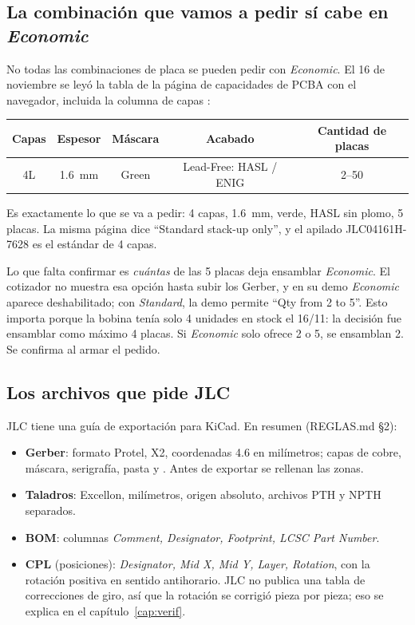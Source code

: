 \subsection{La combinación que vamos a pedir sí cabe en \emph{Economic}}

No todas las combinaciones de placa se pueden pedir con \emph{Economic}. El 16 de noviembre se leyó la tabla de la
página de capacidades de PCBA con el navegador, incluida la columna de capas
:

\begin{center}
\begin{tabular}{@{}ccccc@{}}
\toprule
\textbf{Capas} & \textbf{Espesor} & \textbf{Máscara} & \textbf{Acabado} & \textbf{Cantidad de placas}\\
\midrule
4L & \SI{1.6}{\milli\meter} & Green & Lead-Free: HASL / ENIG & 2--50\\
\bottomrule
\end{tabular}
\end{center}

Es exactamente lo que se va a pedir: 4 capas, \SI{1.6}{\milli\meter}, verde, HASL sin plomo, 5 placas. La misma
página dice ``Standard stack-up only'', y el apilado JLC04161H-7628 es el estándar de 4 capas.

\begin{ojo}
Lo que falta confirmar es \emph{cuántas} de las 5 placas deja ensamblar \emph{Economic}. El cotizador no muestra
esa opción hasta subir los Gerber, y en su demo \emph{Economic} aparece deshabilitado; con \emph{Standard}, la demo
permite ``Qty from 2 to 5''. Esto importa porque la bobina  tenía solo 4 unidades en stock el 16/11: la
decisión fue ensamblar como máximo 4 placas. Si \emph{Economic} solo ofrece 2 o 5, se ensamblan 2. Se confirma al
armar el pedido.
\end{ojo}

\subsection{Los archivos que pide JLC}
JLC tiene una guía de exportación para KiCad. En resumen (REGLAS.md §2):
\begin{itemize}
  \item \textbf{Gerber}: formato Protel, X2, coordenadas 4.6 en milímetros; capas de cobre, máscara, serigrafía,
        pasta y . Antes de exportar se rellenan las zonas.
  \item \textbf{Taladros}: Excellon, milímetros, origen absoluto, archivos PTH y NPTH separados.
  \item \textbf{BOM}: columnas \emph{Comment, Designator, Footprint, LCSC Part Number}.
  \item \textbf{CPL} (posiciones): \emph{Designator, Mid X, Mid Y, Layer, Rotation}, con la rotación positiva en
        sentido antihorario. JLC no publica una tabla de correcciones de giro, así que la rotación se corrigió pieza
        por pieza; eso se explica en el capítulo~\ref{cap:verif}.
\end{itemize}

